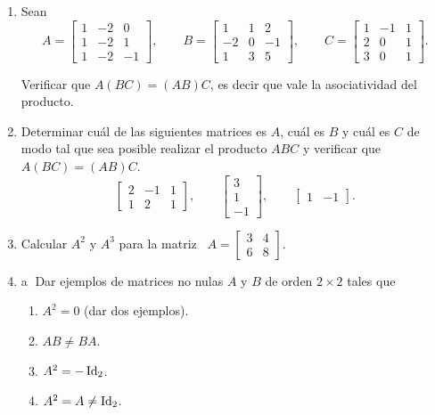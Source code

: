\begin{enumerate}[topsep=6pt,itemsep=.4cm]


\item\label{ej} Sean
$$
A= \begin{bmatrix} 1&-2&0\\ 1&-2&1\\ 1&-2&-1\end{bmatrix},\quad
\quad B= \begin{bmatrix}1&1&2\\ -2&0&-1\\ 1&3&5 \end{bmatrix},
\quad\quad C=\begin{bmatrix}1&-1&1\\ 2&0&1\\ 3&0&1 \end{bmatrix}.
$$

Verificar que $A(BC)=(AB)C$, es decir que vale la asociatividad del producto.


\item\label{ej2} Determinar cuál de las siguientes matrices es $A$, cuál es $B$ y cuál es $C$ de modo tal que sea posible realizar el producto $ABC$ y verificar que $A(BC)=(AB)C$.
\begin{equation*}
\begin{bmatrix} 2 & -1 & 1 \\ 1 & 2 &
1\end{bmatrix},\qquad
\begin{bmatrix} 3 \\ 1 \\ -1\end{bmatrix}, \qquad
\begin{bmatrix} 1 & -1 \end{bmatrix}.
\end{equation*}


\item Calcular $A^2$ y $A^3$ para la matriz \
$
A=\begin{bmatrix}
3 & 4\\ 6 & 8
\end{bmatrix}.
$


\item\label{ejemplos 2x2} \textcircled{a} Dar ejemplos de matrices no nulas $A$ y $B$ de orden $2\times2$ tales que
\begin{multicols}{2}
\begin{enumerate}[topsep=5pt,itemsep=5pt]
 \item $A^2=0$ (dar dos ejemplos).
 \item $AB\neq BA$.
 \item $A^2=-\operatorname{Id}_2$.
 \item $A^2=A\neq\operatorname{Id}_2$.
\end{enumerate}
\end{multicols}



\end{enumerate}
